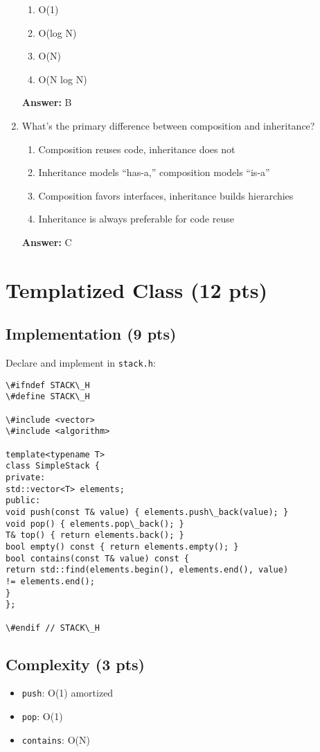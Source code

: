 \documentclass[12pt]{article}
\begin{document}
\begin{enumerate}[label=\arabic*.]
\begin{enumerate}[label=(\Alph*)]
\item O(1)
\item O(log N)
\item O(N)
\item O(N log N)
\end{enumerate}
\textbf{Answer:} B
\item What’s the primary difference between composition and inheritance?
\begin{enumerate}[label=(\Alph*)]
\item Composition reuses code, inheritance does not
\item Inheritance models “has-a,” composition models “is-a”
\item Composition favors interfaces, inheritance builds hierarchies
\item Inheritance is always preferable for code reuse
\end{enumerate}
\textbf{Answer:} C
\end{enumerate}

\section{Templatized Class (12 pts)}
\subsection{Implementation (9 pts)}
Declare and implement in \texttt{stack.h}:
\begin{lstlisting}
\#ifndef STACK\_H
\#define STACK\_H

\#include <vector>
\#include <algorithm>

template<typename T>
class SimpleStack {
private:
std::vector<T> elements;
public:
void push(const T& value) { elements.push\_back(value); }
void pop() { elements.pop\_back(); }
T& top() { return elements.back(); }
bool empty() const { return elements.empty(); }
bool contains(const T& value) const {
return std::find(elements.begin(), elements.end(), value)
!= elements.end();
}
};

\#endif // STACK\_H
\end{lstlisting}

\subsection{Complexity (3 pts)}
\begin{itemize}
\item \texttt{push}: O(1) amortized
\item \texttt{pop}: O(1)
\item \texttt{contains}: O(N)
\end{itemize}
\end{document}
